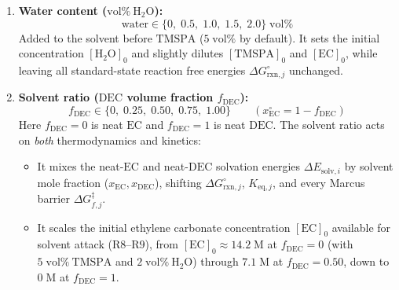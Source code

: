 \documentclass[11pt,a4paper]{article}
\begin{document}
\begin{enumerate}[leftmargin=1.8em]
    \item \textbf{Water content ($\text{vol}\%\ \text{H}_2\text{O}$):}
    \[
        \text{water} \in \{0,\; 0.5,\; 1.0,\; 1.5,\; 2.0\}\;\text{vol}\%
    \]
    Added to the solvent before $\text{TMSPA}$ ($5\;\text{vol}\%$ by default). It sets the initial concentration $[\text{H}_2\text{O}]_0$ and slightly dilutes $[\text{TMSPA}]_0$ and $[\text{EC}]_0$, while leaving all standard-state reaction free energies $\Delta G_{\text{rxn}, j}^\circ$ unchanged.

    \item \textbf{Solvent ratio ($\text{DEC}$ volume fraction $f_{\text{DEC}}$):}
    \[
        f_{\text{DEC}} \in \{0,\; 0.25,\; 0.50,\; 0.75,\; 1.00\} \qquad (x_{\text{EC}}^\circ = 1 - f_{\text{DEC}})
    \]
    Here $f_{\text{DEC}} = 0$ is neat $\text{EC}$ and $f_{\text{DEC}} = 1$ is neat $\text{DEC}$. The solvent ratio acts on \emph{both} thermodynamics and kinetics:
    \begin{itemize}[leftmargin=1.5em]
        \item It mixes the neat-$\text{EC}$ and neat-$\text{DEC}$ solvation energies $\Delta E_{\text{solv}, i}$ by solvent mole fraction ($x_{\text{EC}}, x_{\text{DEC}}$), shifting $\Delta G_{\text{rxn}, j}^\circ$, $K_{\text{eq}, j}$, and every Marcus barrier $\Delta G_{f, j}^\ddagger$.
        \item It scales the initial ethylene carbonate concentration $[\text{EC}]_0$ available for solvent attack ($\text{R8}$--$\text{R9}$), from $[\text{EC}]_0 \approx 14.2\;\text{M}$ at $f_{\text{DEC}} = 0$ (with $5\;\text{vol}\%\ \text{TMSPA}$ and $2\;\text{vol}\%\ \text{H}_2\text{O}$) through $7.1\;\text{M}$ at $f_{\text{DEC}} = 0.50$, down to $0\;\text{M}$ at $f_{\text{DEC}} = 1$.
    \end{itemize}


\end{enumerate}
\end{document}
